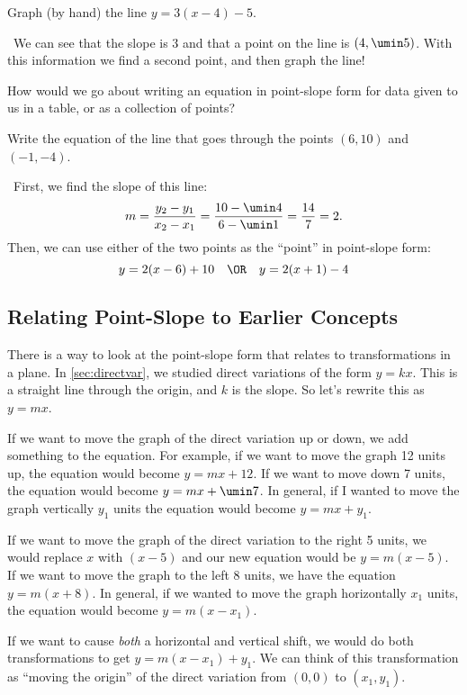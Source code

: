 \begin{boxedex}
Graph (by hand) the line $y=3(x-4)-5$.

\expsoln\ We can see that the slope is 3 and that a point on the line is $(4,\umin5)$. With this information we find a second point, and then graph the line!
\end{boxedex}

How would we go about writing an equation in point-slope form for data given to us in a table, or as a collection of points?

\begin{boxedex}
Write the equation of the line that goes through the points $(6, 10)$ and $(-1, -4)$.

\exsoln\ First, we find the slope of this line: \[m = \frac{y_2-y_1}{x_2-x_1} = \frac{10-\umin4}{6-\umin1} = \frac{14}{7} = 2.\] Then, we can use either of the two points as the ``point'' in point-slope form: \[y=2(x-6)+10 \quad\OR\quad y=2(x+1)-4\]
\end{boxedex}

\subsection{Relating Point-Slope to Earlier Concepts}

There is a way to look at the point-slope form that relates to transformations in a plane. In \cref{sec:directvar}, we studied direct variations of the form $y = kx$. This is a straight line through the origin, and $k$ is the slope. So let's rewrite this as $y=mx$.

If we want to move the graph of the direct variation up or down, we add something to the equation. For example, if we want to move the graph 12 units up, the equation would become $y = mx + 12$. If we want to move down 7 units, the equation would become $y = mx + \umin7$. In general, if I wanted to move the graph vertically $y_1$ units the equation would become $y = mx + y_1$.

If we want to move the graph of the direct variation to the right 5 units, we would replace $x$ with $(x-5)$ and our new equation would be $y = m(x-5)$. If we want to move the graph to the left 8 units, we have the equation $y = m(x + 8)$. In general, if we wanted to move the graph horizontally $x_1$ units, the equation would become $y = m(x-x_1)$.

If we want to cause \textit{both} a horizontal and vertical shift, we would do both transformations to get $y=m(x-x_1)+y_1$. We can think of this transformation as ``moving the origin'' of the direct variation from $(0, 0)$ to $(x_1, y_1)$.

